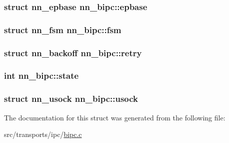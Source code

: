\subsubsection[{epbase}]{\setlength{\rightskip}{0pt plus 5cm}struct {\bf nn\+\_\+epbase} nn\+\_\+bipc\+::epbase}\hypertarget{structnn__bipc_a2b53bc22063b4ef9b9536d6ddf7d7091}{}\label{structnn__bipc_a2b53bc22063b4ef9b9536d6ddf7d7091}
\subsubsection[{fsm}]{\setlength{\rightskip}{0pt plus 5cm}struct {\bf nn\+\_\+fsm} nn\+\_\+bipc\+::fsm}\hypertarget{structnn__bipc_a64911e7ba9bc1358348c0eb7b3583d98}{}\label{structnn__bipc_a64911e7ba9bc1358348c0eb7b3583d98}
\subsubsection[{retry}]{\setlength{\rightskip}{0pt plus 5cm}struct {\bf nn\+\_\+backoff} nn\+\_\+bipc\+::retry}\hypertarget{structnn__bipc_a5b16dc9fb899848e419d82f925cf19bb}{}\label{structnn__bipc_a5b16dc9fb899848e419d82f925cf19bb}
\subsubsection[{state}]{\setlength{\rightskip}{0pt plus 5cm}int nn\+\_\+bipc\+::state}\hypertarget{structnn__bipc_a8f0ba2783e54ed508e4c923e52d7550f}{}\label{structnn__bipc_a8f0ba2783e54ed508e4c923e52d7550f}
\subsubsection[{usock}]{\setlength{\rightskip}{0pt plus 5cm}struct {\bf nn\+\_\+usock} nn\+\_\+bipc\+::usock}\hypertarget{structnn__bipc_aebeda50dee0039b337dbf02cd9f30458}{}\label{structnn__bipc_aebeda50dee0039b337dbf02cd9f30458}


The documentation for this struct was generated from the following file\+:\begin{DoxyCompactItemize}
\item 
src/transports/ipc/\hyperlink{bipc_8c}{bipc.\+c}\end{DoxyCompactItemize}
